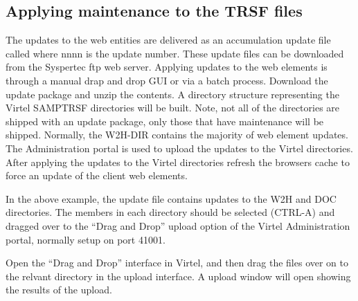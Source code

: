 \documentclass[letterpaper,10pt,english]{sphinxmanual}
\begin{document}

\subsection{Applying maintenance to the TRSF files}
\label{\detokenize{audit_operations_ and_performance:index-45}}\label{\detokenize{audit_operations_ and_performance:applying-maintenance-to-the-trsf-files}}
The updates to the web entities are delivered as an accumulation update file called  where nnnn is the update number. These update files can be downloaded from the Syspertec ftp web server. Applying updates to the web elements is through a manual drap and drop GUI or via a batch process. Download the update package and unzip the contents. A directory structure representing the Virtel SAMPTRSF directories will be built. Note, not all of the directories are shipped with an update package, only those that have maintenance will be shipped. Normally, the W2H-DIR contains the majority of web element updates. The Administration portal is used to upload the updates to the Virtel directories. After applying the updates to the Virtel directories refresh the browsers cache to force an update of the client web elements.



In the above example, the update file contains updates to the W2H and DOC directories. The members in each directory should be selected (CTRL-A) and dragged over to the “Drag and Drop” upload option of the Virtel Administration portal, normally setup on port 41001.



Open the “Drag and Drop” interface in Virtel, and then drag the files over on to the relvant directory in the upload interface. A upload window will open showing the results of the upload.



\end{document}
